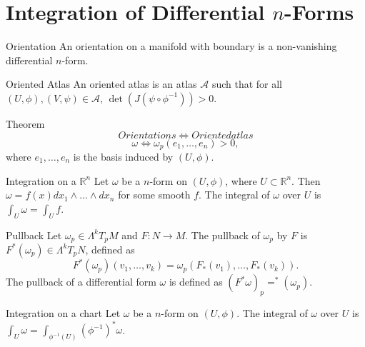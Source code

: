 \documentclass[9pt]{beamer}
\DeclareMathOperator{\Det}{det}
\begin{document}
\section{Integration of Differential $n$-Forms}
\begin{frame}
    \begin{block}{Orientation}
        An orientation on a manifold with boundary is a non-vanishing differential $n$-form.
    \end{block}

    \begin{block}{Oriented Atlas}
        An oriented atlas is an atlas $\mathcal{A}$ such that for all $(U, \phi),(V, \psi)\in \mathcal{A}$, $\Det(J(\psi\circ\phi ^{-1}))>0$.
    \end{block}

    \begin{block}{Theorem}
        \[Orientations \iff Oriented atlas\]
        \[ \omega \iff \omega_p(e_1,\dots,e_n)>0,\] where $e_1,\dots,e_n$ is the basis induced by $(U, \phi)$.
    \end{block}
\end{frame}

\begin{frame}
    \begin{block}{Integration on a $\mathbb{R}^n$}
        Let $\omega$ be a $n$-form on $(U, \phi)$, where $U\subset\mathbb{R}^n$. Then $\omega=f(x)dx_1\wedge\dots\wedge dx_n$ for some smooth $f$. The integral of $\omega$ over $U$ is $\int_U\omega=\int_U f$.
    \end{block}

    \begin{block}{Pullback}
        Let $\omega_p\in \Lambda^kT_pM$ and $F:N \rightarrow  M$. The pullback of $\omega_p$ by $F$ is $F^*(\omega_p)\in \Lambda^kT_pN$, defined as \[F^*(\omega_p)(v_1,\dots,v_k)=\omega_p(F_*(v_1),\dots, F_*(v_k)).\]
        The pullback of a differential form $\omega$ is defined as $(F^*\omega)_p=^*(\omega_p)$.
    \end{block}

    \begin{block}{Integration on a chart}
        Let $\omega$ be a $n$-form on $(U, \phi)$. The integral of $\omega$ over $U$ is $\int_U\omega=\int_{\phi^{-1}(U)}(\phi^{-1})^*\omega$. 
    \end{block}
\end{frame}
\end{document}
